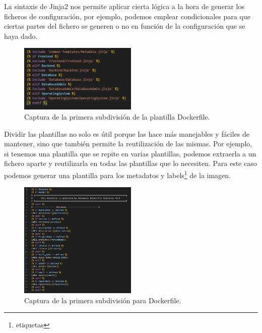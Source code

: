 \documentclass[12pt, a4paper, twoside]{article}
\begin{document}
La sintaxis de Jinja2 nos permite aplicar cierta lógica a la hora de generar los ficheros de configuración, por ejemplo, podemos emplear condicionales para que ciertas partes del fichero se generen o no en función de la configuración que se haya dado.
\begin{figure}[h]
	\centering
	  \includegraphics[width=0.5\textwidth]{Dockerfile.logica.plantillas.jinja.png}
	\caption{Captura de la primera subdivisión de la plantilla Dockerfile.}
\end{figure}

\newpage
Dividir las plantillas no solo es útil porque las hace más manejables y fáciles de mantener, sino que también permite la reutilización de las mismas. Por ejemplo, si tenemos una plantilla que se repite en varias plantillas, podemos extraerla a un fichero aparte y reutilizarla en todas las plantillas que lo necesiten.
Para este caso podemos generar una plantilla para los metadatos y labels\footnote{etiquetas} de la imagen. 

\begin{figure}[h]
	\centering
	  \includegraphics[width=0.5\textwidth]{Dockerfile.metadata.png}
	\caption{Captura de la primera subdivisión para Dockerfile.}
\end{figure}

\newpage
\end{document}
